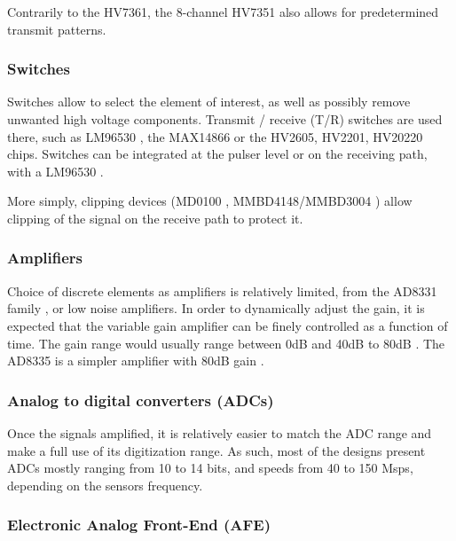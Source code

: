 \documentclass{article}
\begin{document}
Contrarily to the HV7361, the 8-channel HV7351 also allows for predetermined transmit patterns.

\subsubsection{Switches}

Switches allow to select the element of interest, as well as possibly remove unwanted high voltage components. Transmit / receive (T/R) switches are used there, such as LM96530 \cite{wirc_desarrollo_2019,vasudevan_programmable_2014}, the MAX14866 or the HV2605, HV2201, HV20220 \cite{li_new_2014} chips. Switches can be integrated at the pulser level \cite{worthing_using_2016, hidayat_determination_2020} or on the receiving path, with a LM96530 \cite{gwirc_desarrollo_2019, vasudevan_programmable_2014, roman_open-source_2018}. 

More simply, clipping devices (MD0100 \cite{li_new_2014, sharma_development_2015}, MMBD4148/MMBD3004 \cite{ching_chu_designing_nodate}) allow clipping of the signal on the receive path to protect it.

\subsubsection{Amplifiers}

Choice of discrete elements as amplifiers is relatively limited, from the AD8331 family \cite{grasel_characterization_2017,lay_progress_2016,brunner_how_2002}, or low noise amplifiers. In order to dynamically adjust the gain, it is expected that the variable gain amplifier can be finely controlled as a function of time. The gain range would usually range between 0dB and 40dB to 80dB \cite{sharma_development_2015,levesque_architecture_2011}.  The AD8335 is a simpler amplifier with 80dB gain \cite{tortoli_ula-op:_2009}.

\subsubsection{Analog to digital converters (ADCs)}

Once the signals amplified, it is relatively easier to match the ADC range and make a full use of its digitization range. As such, most of the designs present ADCs mostly ranging from 10 to 14 bits, and speeds from 40 to 150 Msps, depending on the sensors frequency.

\subsubsection{Electronic Analog Front-End (AFE)}
\end{document}
